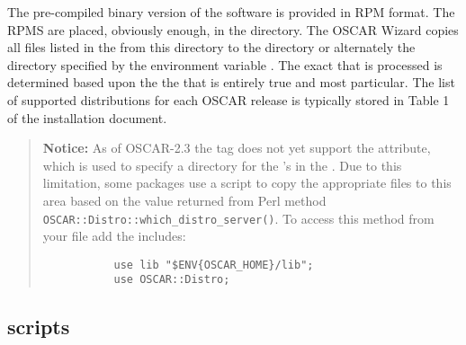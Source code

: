 The pre-compiled binary version of the software is provided in RPM format.
The RPMS are placed, obviously enough, in the  directory.
The OSCAR Wizard copies all files listed in the  from this
 directory to the  directory or
alternately the directory specified by the environment variable
.   The exact  that is processed is
determined based upon the the  that is entirely true and
most particular.  The list of supported distributions for each OSCAR
release is typically stored in Table 1 of the installation document.


\begin{verse}
   {\bfseries Notice: } As of OSCAR-2.3 the  tag does not yet
   support the  attribute, which is used to specify a
   directory for the 's in the .  Due to this
   limitation, some packages use a  script to copy the
   appropriate files to this  area based on the value
   returned from Perl method \verb=OSCAR::Distro::which_distro_server()=.
   To access this method from your  file add the
   includes: 
   \begin{footnotesize}
   \begin{verbatim}
           use lib "$ENV{OSCAR_HOME}/lib";
           use OSCAR::Distro;
   \end{verbatim}
   \end{footnotesize}
\end{verse}




\subsection{scripts}
\label{sect:pkg-scripts}

